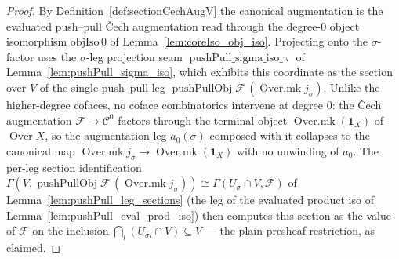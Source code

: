 \begin{proof}
  By Definition~\ref{def:sectionCechAugV} the canonical augmentation is the evaluated push--pull
  {\v C}ech augmentation read through the degree-\(0\) object isomorphism
  \(\mathrm{objIso}\,0\) of Lemma~\ref{lem:coreIso_obj_iso}. Projecting onto the \(\sigma\)-factor
  uses the \(\sigma\)-leg projection seam \(\operatorname{pushPull\_sigma\_iso\_\pi}\) of
  Lemma~\ref{lem:pushPull_sigma_iso}, which exhibits this coordinate as the section over \(V\) of
  the single push--pull leg \(\operatorname{pushPullObj}\mathcal{F}\,(\operatorname{Over.mk}
  j_\sigma)\). Unlike the higher-degree cofaces, no coface combinatorics intervene at degree \(0\):
  the {\v C}ech augmentation \(\mathcal{F} \to \mathcal{C}^0\) factors through the terminal object
  \(\operatorname{Over.mk}(\mathbf{1}_X)\) of \(\operatorname{Over}X\), so the augmentation leg
  \(a_0(\sigma)\) composed with it collapses to the canonical map
  \(\operatorname{Over.mk} j_\sigma \to \operatorname{Over.mk}(\mathbf{1}_X)\) with no unwinding of
  \(a_0\). The per-leg section identification
  \(\Gamma(V,\operatorname{pushPullObj}\mathcal{F}\,(\operatorname{Over.mk} j_\sigma)) \cong
  \Gamma(U_\sigma \cap V,\mathcal{F})\) of Lemma~\ref{lem:pushPull_leg_sections} (the leg of the
  evaluated product iso of Lemma~\ref{lem:pushPull_eval_prod_iso}) then computes this section as
  the value of \(\mathcal{F}\) on the inclusion \(\bigcap_l(U_{\sigma l}\cap V)\subseteq V\) — the
  plain presheaf restriction, as claimed.
\end{proof}

